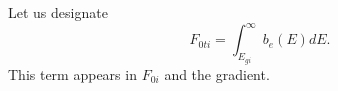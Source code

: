 \documentclass[12pt]{article}
\begin{document}
Let us designate 
\begin{equation}
F_{0ti} = \int_{E_{gi}}^{\infty} b_e(E) dE.
\end{equation}
This term appears in $F_{0i}$ and the gradient.  

%
\end{document}
